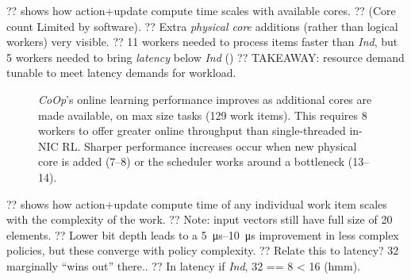 \documentclass[sigconf,natbib=false]{acmart}
\newcommand{\Coopfw}{\emph{CoOp}}
\newcommand{\Indfw}{\emph{Ind}}
\begin{document}
??  shows how action+update compute time scales with available cores.
?? (Core count Limited by software).
?? Extra \emph{physical core} additions (rather than logical workers) very visible.
?? 11 workers needed to process items faster than \Indfw{}, but 5 workers needed to bring \emph{latency} below \Indfw{} ()
?? TAKEAWAY: resource demand tunable to meet latency demands for workload.

\begin{figure}
	\caption{
		\Coopfw{}'s online learning performance improves as additional cores are made available, on max size tasks (\num{129} work items). This requires \num{8} workers to offer greater online throughput than single-threaded in-NIC RL. Sharper performance increases occur when new physical core is added (\numrange{7}{8}) or the scheduler works around a bottleneck (\numrange{13}{14}).\label{fig:vary-core}}
\end{figure}

??  shows how action+update compute time of any individual work item scales with the complexity of the work.
?? Note: input vectors still have full size of 20 elements.
?? Lower bit depth leads to a \SIrange{5}{10}{\micro\second} improvement in less complex policies, but these converge with policy complexity.
?? Relate this to latency? \SI{32}{\bit} marginally ``wins out'' there..
?? In latency if \Indfw{}, 32 == 8 < 16 (hmm).
\end{document}
